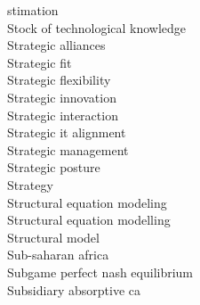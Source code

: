 \documentclass[a4paper]{article}
\begin{document}
\begin{multicols*}{2}
\begin{footnotesize}
stimation \\ Stock of technological knowledge \\ Strategic alliances \\ Strategic fit \\ Strategic flexibility \\ Strategic innovation \\ Strategic interaction \\ Strategic it alignment \\ Strategic management \\ Strategic posture \\ Strategy \\ Structural equation modeling \\ Structural equation modelling \\ Structural model \\ Sub-saharan africa \\ Subgame perfect nash equilibrium \\ Subsidiary absorptive ca
\end{footnotesize}
\end{multicols*}
\end{document}
